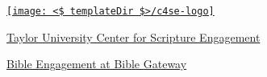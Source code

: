 \vfill

\begin{center}
  \vspace{0.25in}
  \href{http://tucse.taylor.edu/}{\texttt{[image: <\$ templateDir \$>/c4se-logo]}}

  \vspace{0.25in}
  \href{http://tucse.taylor.edu/}{Taylor University Center for Scripture Engagement}

  \vspace{0.25in}
  \href{https://www.biblegateway.com/resources/scripture-engagement/}{Bible Engagement at Bible Gateway }
\end{center}
